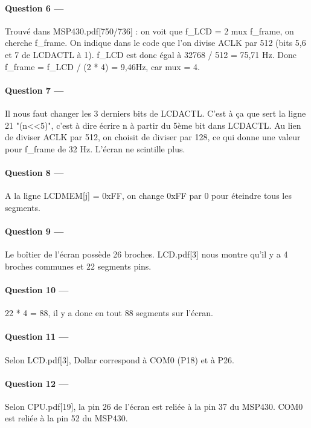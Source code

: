 \documentclass[a4paper,11pt,article]{memoir}
\begin{document}
\paragraph{Question 6 ---}  Trouvé dans MSP430.pdf[750/736] : on voit que {f_LCD = 2 \times mux \times f_frame}, on cherche f_frame. On indique dans le code que l'on divise ACLK par 512 (bits 5,6 et 7 de LCDACTL à 1). f_LCD est donc égal à 32768 / 512 = 75,71 Hz. Donc f_frame = f_LCD / (2 * 4) = 9,46Hz, car mux = 4.

\paragraph{Question 7 ---}  Il nous faut changer les 3 derniers bits de LCDACTL. C'est à ça que sert la ligne 21 "(n<<5)", c'est à dire écrire n à partir du 5ème bit dans LCDACTL. Au lien de diviser ACLK par 512, on choisit de diviser par 128, ce qui donne une valeur pour f_frame de 32 Hz. L'écran ne scintille plus.

\paragraph{Question 8 ---}  A la ligne LCDMEM[j] = 0xFF, on change 0xFF par 0 pour éteindre tous les segments.

\paragraph{Question 9 ---}  Le boîtier de l'écran possède 26 broches. LCD.pdf[3] nous montre qu'il y a 4 broches communes et 22 segments pins.

\paragraph{Question 10 ---}  22 * 4 = 88, il y a donc en tout 88 segments sur l'écran.

\paragraph{Question 11 ---}  Selon LCD.pdf[3], Dollar correspond à COM0 (P18) et à P26.

\paragraph{Question 12 ---}  Selon CPU.pdf[19], la pin 26 de l'écran est reliée à la pin 37 du MSP430. COM0 est reliée à la pin 52 du MSP430.
\end{document}
